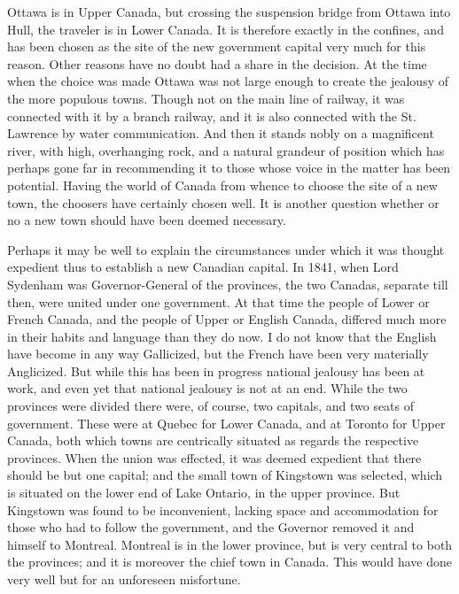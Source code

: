 Ottawa is in Upper Canada, but crossing the suspension bridge from
Ottawa into Hull, the traveler is in Lower Canada.  It is therefore
exactly in the confines, and has been chosen as the site of the new
government capital very much for this reason.  Other reasons have
no doubt had a share in the decision.  At the time when the choice
was made Ottawa was not large enough to create the jealousy of the
more populous towns.  Though not on the main line of railway, it
was connected with it by a branch railway, and it is also connected
with the St. Lawrence by water communication.  And then it stands
nobly on a magnificent river, with high, overhanging rock, and a
natural grandeur of position which has perhaps gone far in
recommending it to those whose voice in the matter has been
potential.  Having the world of Canada from whence to choose the
site of a new town, the choosers have certainly chosen well.  It is
another question whether or no a new town should have been deemed
necessary.

Perhaps it may be well to explain the circumstances under which it
was thought expedient thus to establish a new Canadian capital.  In
1841, when Lord Sydenham was Governor-General of the provinces, the
two Canadas, separate till then, were united under one government.
At that time the people of Lower or French Canada, and the people
of Upper or English Canada, differed much more in their habits and
language than they do now.  I do not know that the English have
become in any way Gallicized, but the French have been very
materially Anglicized.  But while this has been in progress
national jealousy has been at work, and even yet that national
jealousy is not at an end.  While the two provinces were divided
there were, of course, two capitals, and two seats of government.
These were at Quebec for Lower Canada, and at Toronto for Upper
Canada, both which towns are centrically situated as regards the
respective provinces.  When the union was effected, it was deemed
expedient that there should be but one capital; and the small town
of Kingstown was selected, which is situated on the lower end of
Lake Ontario, in the upper province.  But Kingstown was found to be
inconvenient, lacking space and accommodation for those who had to
follow the government, and the Governor removed it and himself to
Montreal.  Montreal is in the lower province, but is very central
to both the provinces; and it is moreover the chief town in Canada.
This would have done very well but for an unforeseen misfortune.

